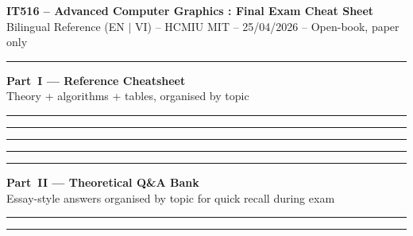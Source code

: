 \documentclass[a4paper,10pt]{extarticle}
\begin{document}
\begin{center}
\textbf{\large IT516 -- Advanced Computer Graphics : Final Exam Cheat Sheet}\\[1pt]
\footnotesize Bilingual Reference (EN $|$ VI) -- HCMIU MIT -- 25/04/2026 -- Open-book, paper only
\end{center}
\vspace{-6pt}\hrule\vspace{4pt}



\clearpage

\begin{center}
\textbf{\large Part~I — Reference Cheatsheet}\\[1pt]
\footnotesize Theory + algorithms + tables, organised by topic
\end{center}
\vspace{-6pt}\hrule\vspace{4pt}



\vfill\hrule\vspace{4pt}



\vfill\hrule\vspace{4pt}



\vfill\hrule\vspace{4pt}



\vfill\hrule\vspace{4pt}



\clearpage
\begin{center}
\textbf{\large Part~II — Theoretical Q\&A Bank} \\[1pt]
\footnotesize Essay-style answers organised by topic for quick recall during exam
\end{center}
\vspace{-6pt}\hrule\vspace{4pt}



\vfill\hrule\vspace{4pt}


\end{document}
